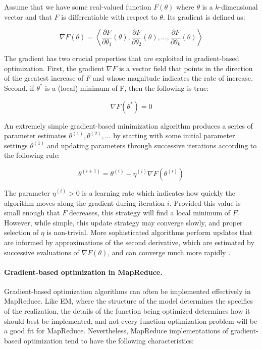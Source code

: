 Assume that we have some real-valued function $F(\theta)$ where
$\theta$ is a $k$-dimensional vector and that $F$ is differentiable
with respect to $\theta$.  Its gradient is defined as:

\begin{equation}
\nabla F(\theta) = \left\langle \frac{\partial F}{\partial \theta_1}(\theta), \frac{\partial F}{\partial \theta_2}(\theta) , \ldots , \frac{\partial F}{\partial \theta_k}(\theta) \right\rangle
\end{equation}

\noindent The gradient has two crucial properties that are exploited
in gradient-based optimization.  First, the gradient $\nabla F$ is a
vector field that points in the direction of the greatest increase of
$F$ and whose magnitude indicates the rate of increase.  Second, if
$\theta^*$ is a (local) minimum of F, then the following is true:

\begin{equation}
\nabla F(\theta^*) = 0
\end{equation}

An extremely simple gradient-based minimization algorithm produces a
series of parameter estimates $\theta^{(1)}, \theta^{(2)}, \ldots$ by
starting with some initial parameter settings $\theta^{(1)}$ and
updating parameters through successive iterations according to the
following rule:

\begin{equation}
\theta^{(i+1)} = \theta^{(i)} - \eta^{(i)} \nabla F(\theta^{(i)})
\label{chapter6_eq_grad_opt1}
\end{equation}

\noindent The parameter $\eta^{(i)} > 0$ is a learning rate which
indicates how quickly the algorithm moves along the gradient during
iteration $i$.  Provided this value is small enough that $F$
decreases, this strategy will find a local minimum of $F$.  However,
while simple, this update strategy may converge slowly, and proper
selection of $\eta$ is non-trivial.  More sophisticated algorithms
perform updates that are informed by approximations of the second
derivative, which are estimated by successive evaluations of $\nabla
F(\theta)$, and can converge much more rapidly \cite{LBFGS}.

\paragraph{\bf Gradient-based optimization in MapReduce.}
Gradient-based optimization algorithms can often be implemented
effectively in MapReduce.  Like EM, where the structure of the model
determines the specifics of the realization, the details of the
function being optimized determines how it should best be implemented,
and not every function optimization problem will be a good fit for
MapReduce.  Nevertheless, MapReduce implementations of gradient-based
optimization tend to have the following characteristics:

